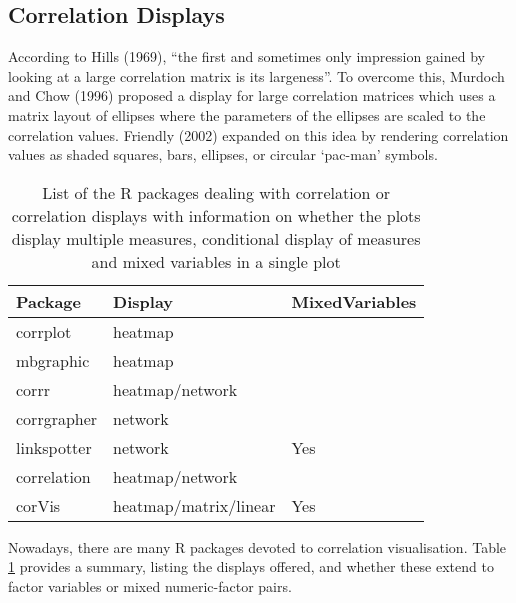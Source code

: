 \hypertarget{correlation-displays}{%
\subsection{Correlation Displays}\label{correlation-displays}}

According to Hills (1969), ``the first and sometimes only impression gained by looking at a large correlation matrix is its largeness''. To overcome this, Murdoch and Chow (1996) proposed a display for large correlation matrices which uses a matrix layout of ellipses where the parameters of the ellipses are scaled to the correlation values. Friendly (2002) expanded on this idea by rendering correlation values as shaded squares, bars, ellipses, or circular `pac-man' symbols.

\begin{table}

\caption{\label{tab:corrdisplay-packages}List of the R packages dealing with correlation or correlation displays with information on whether the plots display multiple measures, conditional display of measures and mixed variables in a single plot}
\centering
\begin{tabular}[t]{lll}
\toprule
Package & Display & MixedVariables\\
\midrule
corrplot & heatmap & \\
mbgraphic & heatmap & \\
corrr & heatmap/network & \\
corrgrapher & network & \\
linkspotter & network & Yes\\
\addlinespace
correlation & heatmap/network & \\
corVis & heatmap/matrix/linear & Yes\\
\bottomrule
\end{tabular}
\end{table}

Nowadays, there are many R packages devoted to correlation visualisation. Table \ref{tab:corrdisplay-packages} provides a summary, listing the displays offered, and whether these extend to factor variables or mixed numeric-factor pairs.

